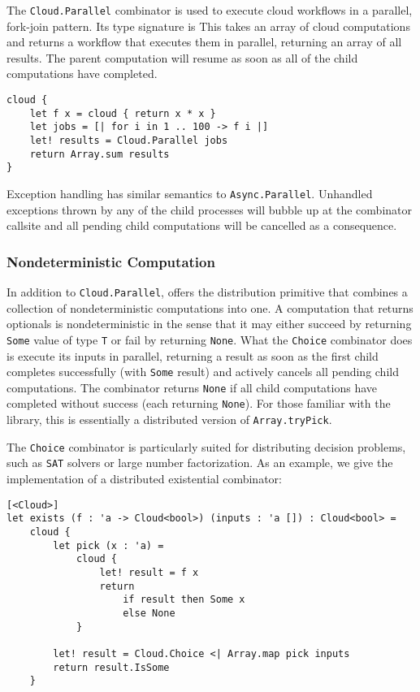 The \texttt{Cloud.Parallel} combinator is used to execute cloud workflows in a parallel, 
fork-join pattern. Its type signature is
This takes an array of cloud computations and returns a workflow that executes them
in parallel, returning an array of all results.
The parent computation will resume as soon as all of the child computations have completed.
\begin{lstlisting}
cloud {
    let f x = cloud { return x * x }
    let jobs = [| for i in 1 .. 100 -> f i |]   
    let! results = Cloud.Parallel jobs
    return Array.sum results
}
\end{lstlisting}
%
Exception handling has similar semantics to \texttt{Async.Parallel}.
Unhandled exceptions thrown by any of the child processes will
bubble up at the combinator callsite and all pending child computations
will be cancelled as a consequence.

\subsubsection*{Nondeterministic Computation}
%
In addition to \texttt{Cloud.Parallel}, \mbrace{} offers the distribution primitive
that combines a collection of nondeterministic computations into one.
A computation that returns optionals is nondeterministic in the sense that
it may either succeed by returning \texttt{Some} value of type \texttt{\uq{}T} or
fail by returning \texttt{None}.
What the \texttt{Choice} combinator does is execute its inputs in parallel,
returning a result as soon as the first child completes successfully 
(with \texttt{Some} result) and actively cancels all pending child computations.
The combinator returns \texttt{None} if all child computations have completed
without success (each returning \texttt{None}).
For those familiar with the \fsharp{} library, this is essentially a distributed
version of \texttt{Array.tryPick}.

The \texttt{Choice} combinator is particularly suited for distributing decision problems,
such as \texttt{SAT} solvers or large number factorization.
As an example, we give the implementation of a distributed existential combinator:
\begin{lstlisting}
[<Cloud>]
let exists (f : 'a -> Cloud<bool>) (inputs : 'a []) : Cloud<bool> =
    cloud {
        let pick (x : 'a) =
            cloud {
                let! result = f x
                return
                    if result then Some x
                    else None
            }

        let! result = Cloud.Choice <| Array.map pick inputs
        return result.IsSome 
    }
\end{lstlisting}

